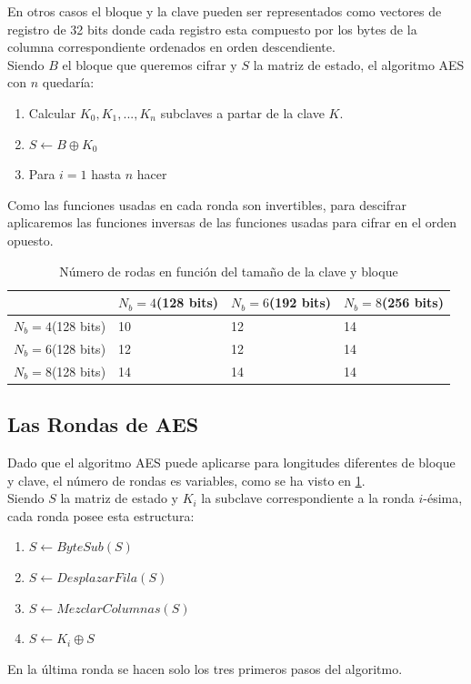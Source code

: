 En otros casos el bloque y la clave pueden ser representados como vectores de registro de 32 bits donde cada registro esta compuesto por los bytes de la columna correspondiente ordenados en orden descendiente.\\

Siendo $B$ el bloque que queremos cifrar y $S$ la matriz de estado, el algoritmo AES con $n$ quedaría:

\begin{enumerate}
	\item Calcular $K_0, K_1,...,K_n$ subclaves a partar de la clave $K$.
	\item $S\leftarrow B \oplus K_0$
	\item Para $i=1$ hasta $n$ hacer
\end{enumerate}
Como las funciones usadas en cada ronda son invertibles, para descifrar aplicaremos las funciones inversas de las funciones usadas para cifrar en el orden opuesto.

\begin{table}[htb]
	\begin{center}
		\begin{tabular}{| l | l | l | l |}
				\hline
				& $N_b = 4$(128 bits) & $N_b = 6$(192 bits)& $N_b = 8$(256 bits)\\ \hline
				$N_b = 4$(128 bits)& 10 & 12 & 14\\ \hline
				$N_b = 6$(128 bits)& 12 & 12 & 14\\ \hline
				$N_b = 8$(128 bits)& 14 & 14 & 14\\ \hline
		\end{tabular}
		\caption{Número de rodas en función del tamaño de la clave y bloque}
		\label{rondas_aes}
	\end{center}
\end{table}

\subsection{Las Rondas de AES}
Dado que el algoritmo AES puede aplicarse para longitudes diferentes de bloque y clave, el número de rondas es variables, como se ha visto en \ref{rondas_aes}.\\
Siendo $S$ la matriz de estado y $K_i$ la subclave correspondiente a la ronda $i$-ésima, cada ronda posee esta estructura:
\begin{enumerate}
	\item $S \leftarrow ByteSub(S)$
	\item $S \leftarrow DesplazarFila(S)$
	\item $S \leftarrow MezclarColumnas(S)$
	\item $S \leftarrow K_i \oplus S$
\end{enumerate}
En la última ronda se hacen solo los tres primeros pasos del algoritmo.

